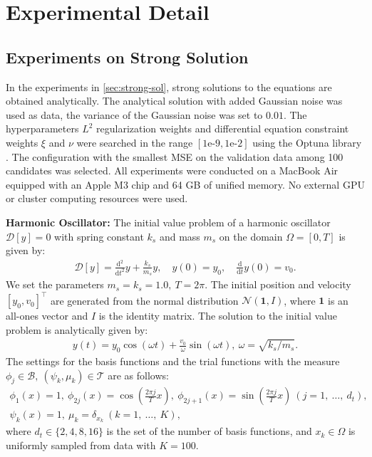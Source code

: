 \documentclass{article}
\theoremstyle{plain}
\theoremstyle{definition}
\theoremstyle{remark}
\begin{document}
\section{Experimental Detail}
\label{app:exp_detail}

\subsection{Experiments on Strong Solution}
\label{app:exp-strong-sol}
In the experiments in \cref{sec:strong-sol}, strong solutions to the equations are obtained analytically. The analytical solution with added Gaussian noise was used as data, the variance of the Gaussian noise was set to \(0.01\). The hyperparameters \(L^2\) regularization weights and differential equation constraint weights \(\xi\) and \(\nu\) were searched in the range \([1\text{e-}9, 1\text{e-}2]\) using the Optuna library \citep{akiba2019optuna}. The configuration with the smallest MSE on the validation data among 100 candidates was selected. All experiments were conducted on a MacBook Air equipped with an Apple M3 chip and 64 GB of unified memory. No external GPU or cluster computing resources were used.


\textbf{Harmonic Oscillator:} The initial value problem of a harmonic oscillator \(\mathscr{D}[y]=0\) with spring constant \( k_s \) and mass \( m_s \) on the domain \( \Omega = [0, T] \) is given by:
\begin{align*}
    \mathscr{D}[y] = \frac{\mathrm{d}^2}{\mathrm{d}t^2}y + \frac{k_s}{m_s}y,\quad y(0)=y_0,\quad \frac{\mathrm{d}}{\mathrm{d}t}y(0)=v_0.
\end{align*}
We set the parameters \(m_s = k_s = 1.0,\ T = 2\pi\). The initial position and velocity \([y_0, v_0]^{\top}\) are generated from the normal distribution \(\mathcal{N}(\bm{1}, I)\), where \(\bm{1}\) is an all-ones vector and \(I\) is the identity matrix.
The solution to the initial value problem is analytically given by:
\begin{align*}
    y(t) = y_0 \cos(\omega t) + \frac{v_0}{\omega} \sin(\omega t), \ \omega = \sqrt{k_s/m_s}.
\end{align*}
The settings for the basis functions and the trial functions with the measure \(\phi_j \in \mathcal{B},\ (\psi_k, \mu_k) \in \mathcal{T}\) are as follows:
\begin{gather*}
    \phi_1(x) = 1,\
    \phi_{2j}(x) = \cos\left(\frac{2 \pi j}{T}x\right),\ \phi_{2j+1}(x) = \sin\left(\frac{2 \pi j}{T}x\right) \ (j = 1,\ \ldots,\ d_t),\\
    \psi_k(x) = 1,\ \mu_k = \delta_{x_k} \ (k = 1,\ \ldots,\ K),
\end{gather*}
where \(d_t \in \{2, 4, 8, 16\}\) is the set of the number of basis functions, and \(x_k \in \Omega\) is uniformly sampled from data with \(K = 100\).
\end{document}
